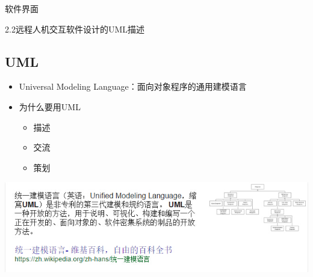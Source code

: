 \documentclass{beamer}
\begin{document}
\begin{frame}[t]{软件界面}
\end{frame}
\begin{frame}[t]{2.2远程人机交互软件设计的UML描述}
    \subsection{UML}
    \begin{itemize}
        \item Universal Modeling Language：面向对象程序的通用建模语言
        \item 为什么要用UML
            \begin{itemize}
                \item 描述
                \item 交流
                \item 策划
            \end{itemize}
    \end{itemize}
    \includegraphics[scale=0.6]{./resource/graph/UML-google.jpg}
\end{frame}
\end{document}
